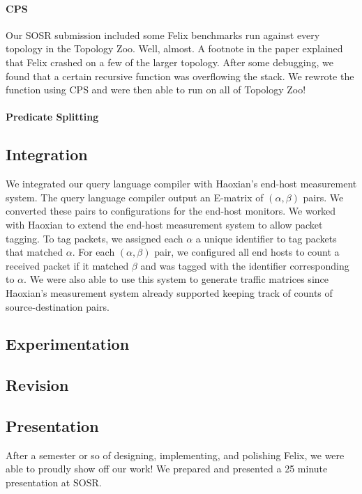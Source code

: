 \documentclass{hw}
\begin{document}
\paragraph{CPS}
Our SOSR submission included some Felix benchmarks run against every topology
in the Topology Zoo. Well, almost. A footnote in the paper explained that Felix
crashed on a few of the larger topology. After some debugging, we found that a
certain recursive function was overflowing the stack. We rewrote the function
using CPS and were then able to run on all of Topology Zoo!

\paragraph{Predicate Splitting}

\subsection{Integration}
We integrated our query language compiler with Haoxian's end-host measurement
system. The query language compiler output an E-matrix of $(\alpha, \beta)$
pairs. We converted these pairs to configurations for the end-host monitors. We
worked with Haoxian to extend the end-host measurement system to allow packet
tagging. To tag packets, we assigned each $\alpha$ a unique identifier to tag
packets that matched $\alpha$. For each $(\alpha, \beta)$ pair, we configured
all end hosts to count a received packet if it matched $\beta$ and was tagged
with the identifier corresponding to $\alpha$.  We were also able to use this
system to generate traffic matrices since Haoxian's measurement system already
supported keeping track of counts of source-destination pairs.

\subsection{Experimentation}

\subsection{Revision}

\subsection{Presentation}
After a semester or so of designing, implementing, and polishing Felix, we were
able to proudly show off our work! We prepared and presented a 25 minute
presentation at SOSR.
\end{document}
